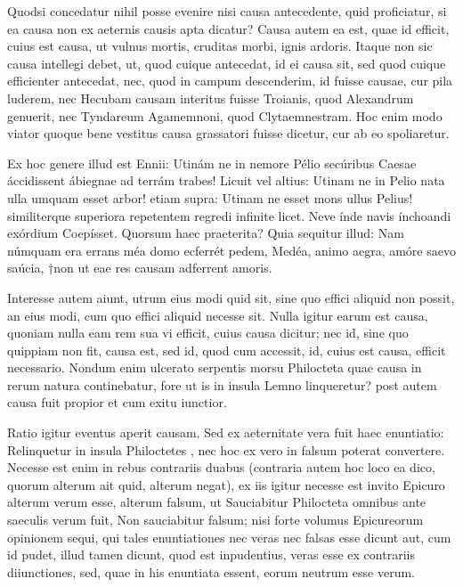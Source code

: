  Quodsi concedatur nihil posse evenire nisi causa antecedente, quid proficiatur, si ea causa non ex aeternis causis apta dicatur? Causa autem ea est, quae id efficit, cuius est causa, ut vulnus mortis, cruditas morbi, ignis ardoris. Itaque non sic causa intellegi debet, ut, quod cuique antecedat, id ei causa sit, sed quod cuique efficienter antecedat, nec, quod in campum descenderim, id fuisse causae, cur pila luderem, nec Hecubam causam interitus fuisse Troianis, quod Alexandrum genuerit, nec Tyndareum Agamemnoni, quod Clytaemnestram. Hoc enim modo viator quoque bene vestitus causa grassatori fuisse dicetur, cur ab eo spoliaretur.

 Ex hoc genere illud est Ennii: Utinám ne in nemore Pélio secúribus Caesae áccidissent ábiegnae ad terrám trabes! Licuit vel altius: Utinam ne in Pelio nata ulla umquam esset arbor! etiam supra: Utinam ne esset mons ullus Pelius! similiterque superiora repetentem regredi infinite licet. Neve índe navis ínchoandi exórdium Coepísset. Quorsum haec praeterita? Quia sequitur illud: Nam númquam era errans méa domo ecferrét pedem, Medéa, animo aegra, amóre saevo saúcia, †non ut eae res causam adferrent amoris.

 Interesse autem aiunt, utrum eius modi quid sit, sine quo effici aliquid non possit, an eius modi, cum quo effici aliquid necesse sit. Nulla igitur earum est causa, quoniam nulla eam rem sua vi efficit, cuius causa dicitur; nec id, sine quo quippiam non fit, causa est, sed id, quod cum accessit, id, cuius est causa, efficit necessario. Nondum enim ulcerato serpentis morsu Philocteta quae causa in rerum natura continebatur, fore ut is in insula Lemno linqueretur? post autem causa fuit propior et cum exitu iunctior.

 Ratio igitur eventus aperit causam. Sed ex aeternitate vera fuit haec enuntiatio: Relinquetur in insula Philoctetes , nec hoc ex vero in falsum poterat convertere. Necesse est enim in rebus contrariis duabus (contraria autem hoc loco ea dico, quorum alterum ait quid, alterum negat), ex iis igitur necesse est invito Epicuro alterum verum esse, alterum falsum, ut Sauciabitur Philocteta omnibus ante saeculis verum fuit, Non sauciabitur falsum; nisi forte volumus Epicureorum opinionem sequi, qui tales enuntiationes nec veras nec falsas esse dicunt aut, cum id pudet, illud tamen dicunt, quod est inpudentius, veras esse ex contrariis diiunctiones, sed, quae in his enuntiata essent, eorum neutrum esse verum.

